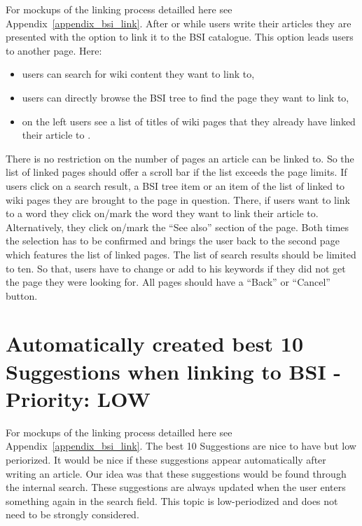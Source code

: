 \begin{tcolorbox}[breakable,colback=red!12,colframe=red!40!black,title=UPDATE 15/11/2017]
    For mockups of the linking process detailled here see Appendix~\ref{appendix_bsi_link}.
    After or while users write their articles they are presented with the option to link it to the BSI catalogue.
    This option leads users to another page. Here:
    \begin{itemize}

        \item users can search for wiki content they want to link to,
        \item users can directly browse the BSI tree to find the page they want to link to,
        \item on the left  users see a list of titles of wiki pages that they already have linked their article to
            .
    \end{itemize}
    There is no restriction on the number of pages an article can be linked to.
    So the list of linked pages should offer a scroll bar if the list exceeds the page limits.
    If users click on a search result, a BSI tree item or an item of the list of linked to wiki pages they are brought to the page in question.
    There, if users want to link to a word they click on/mark the word they want to link their article to.
    Alternatively, they click on/mark the ``See also'' section of the page.
    Both times the selection has to be confirmed and brings the user back to the second page which features the list of linked pages.
    The list of search results should be limited to ten.
    So that, users have to change or add to his keywords if they did not get the page they were looking for.
    All pages should have a ``Back'' or ``Cancel'' button.  
\end{tcolorbox}


\section{Automatically created best 10 Suggestions when linking to BSI - Priority: LOW}
\begin{tcolorbox}[breakable,colback=red!18,colframe=red!40!black,title=UPDATE 01/12/2017]
   For mockups of the linking process detailled here see Appendix~\ref{appendix_bsi_link}.
   The best 10 Suggestions are nice to have but low periorized. It would be nice if these suggestions appear automatically after writing an article. Our idea was that these suggestions would be found through the internal search. These suggestions are always updated when the user enters something again in the search field. This topic is low-periodized and does not need to be strongly considered.   
\end{tcolorbox}


